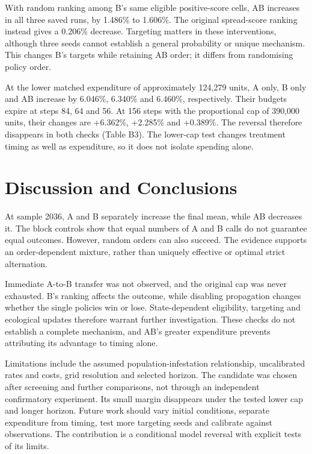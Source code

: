 \documentclass[a4paper,11pt]{article}
\begin{document}
With random ranking among B's same eligible positive-score cells, AB increases in all three saved runs, by 1.486\% to 1.606\%. The original spread-score ranking instead gives a 0.206\% decrease. Targeting matters in these interventions, although three seeds cannot establish a general probability or unique mechanism. This changes B's targets while retaining AB order; it differs from randomising policy order.

At the lower matched expenditure of approximately 124,279 units, A only, B only and AB increase by 6.046\%, 6.340\% and 6.460\%, respectively. Their budgets expire at steps 84, 64 and 56. At 156 steps with the proportional cap of 390,000 units, their changes are +6.362\%, +2.285\% and +0.389\%. The reversal therefore disappears in both checks (Table B3). The lower-cap test changes treatment timing as well as expenditure, so it does not isolate spending alone.

\section{Discussion and Conclusions}

At sample 2036, A and B separately increase the final mean, while AB decreases it. The block controls show that equal numbers of A and B calls do not guarantee equal outcomes. However, random orders can also succeed. The evidence supports an order-dependent mixture, rather than uniquely effective or optimal strict alternation.

Immediate A-to-B transfer was not observed, and the original cap was never exhausted. B's ranking affects the outcome, while disabling propagation changes whether the single policies win or lose. State-dependent eligibility, targeting and ecological updates therefore warrant further investigation. These checks do not establish a complete mechanism, and AB's greater expenditure prevents attributing its advantage to timing alone.

Limitations include the assumed population-infestation relationship, uncalibrated rates and costs, grid resolution and selected horizon. The candidate was chosen after screening and further comparisons, not through an independent confirmatory experiment. Its small margin disappears under the tested lower cap and longer horizon. Future work should vary initial conditions, separate expenditure from timing, test more targeting seeds and calibrate against observations. The contribution is a conditional model reversal with explicit tests of its limits.
\end{document}
